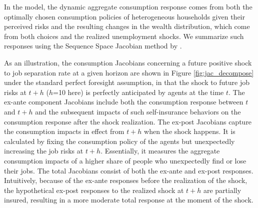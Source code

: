  
In the model, the dynamic aggregate consumption response comes from both the optimally chosen consumption policies of heterogeneous households given their perceived risks and the resulting changes in the wealth distribution, which come from both choices and the realized unemployment shocks. We summarize such responses using the Sequence Space Jacobian method by \cite{auclert2021using}. 

As an illustration, the consumption Jacobians concerning a future positive shock to job separation rate at a given horizon are shown in Figure \ref{fig:jac_decompose} under the standard perfect foresight assumption, in that the shock to future job risks at $t+h$ ($h$=10 here) is perfectly anticipated by agents at the time $t$. The ex-ante component Jacobians include both the consumption response between $t$ and $t+h$ and the subsequent impacts of such self-insurance behaviors on the consumption response after the shock realization. The ex-post Jacobians capture the consumption impacts in effect from $t+h$ when the shock happens. It is calculated by fixing the consumption policy of the agents but unexpectedly increasing the job risks at $t+h$. Essentially, it measures the aggregate consumption impacts of a higher share of people who unexpectedly find or lose their jobs. The total Jacobians consist of both the ex-ante and ex-post responses. Intuitively, because of the ex-ante responses before the realization of the shock, the hypothetical ex-post responses to the realized shock at $t+h$ are partially insured, resulting in a more moderate total response at the moment of the shock.  

